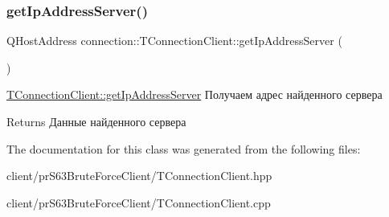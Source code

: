 \subsubsection{\texorpdfstring{get\+Ip\+Address\+Server()}{getIpAddressServer()}}
{\footnotesize\ttfamily Q\+Host\+Address connection\+::\+T\+Connection\+Client\+::get\+Ip\+Address\+Server (\begin{DoxyParamCaption}{ }\end{DoxyParamCaption})}



\hyperlink{classconnection_1_1_t_connection_client_a00738647cc6afff4d98185faa375ddb4}{T\+Connection\+Client\+::get\+Ip\+Address\+Server} Получаем адрес найденного сервера 

\begin{DoxyReturn}{Returns}
Данные найденного сервера 
\end{DoxyReturn}


The documentation for this class was generated from the following files\+:\begin{DoxyCompactItemize}
\item 
client/pr\+S63\+Brute\+Force\+Client/T\+Connection\+Client.\+hpp\item 
client/pr\+S63\+Brute\+Force\+Client/T\+Connection\+Client.\+cpp\end{DoxyCompactItemize}
